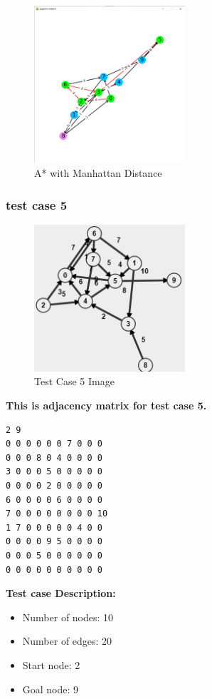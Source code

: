 \begin{figure}[h!]
    \centering
    \includegraphics[width=0.5\textwidth]{result/testcase4/astar2.png}
    \caption{A* with Manhattan Distance}
\end{figure}
\clearpage

\subsubsection{test case 5}
\begin{figure}[h!]
    \centering
    \includegraphics[width=0.5\textwidth]{testcase/5.PNG}
    \caption{Test Case 5 Image}
\end{figure}
\textbf{This is adjacency matrix for test case 5.}
\begin{verbatim}
2 9
0 0 0 0 0 0 7 0 0 0
0 0 0 8 0 4 0 0 0 0
3 0 0 0 5 0 0 0 0 0
0 0 0 0 2 0 0 0 0 0
6 0 0 0 0 6 0 0 0 0
7 0 0 0 0 0 0 0 0 10
1 7 0 0 0 0 0 4 0 0
0 0 0 0 9 5 0 0 0 0
0 0 0 5 0 0 0 0 0 0
0 0 0 0 0 0 0 0 0 0   
\end{verbatim}
\textbf{Test case Description:}
\begin{itemize}
    \item Number of nodes: 10 
    \item Number of edges: 20
    \item Start node: 2
    \item Goal node: 9
\end{itemize}

